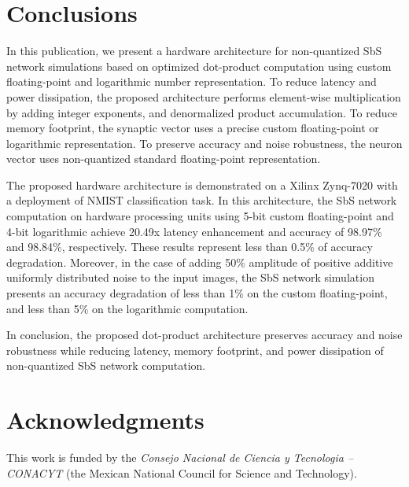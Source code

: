 \section{Conclusions}
In this publication, we present a hardware architecture for non-quantized SbS network simulations based on optimized dot-product computation using custom floating-point and logarithmic number representation. To reduce latency and power dissipation, the proposed architecture performs element-wise multiplication by adding integer exponents, and denormalized product accumulation. To reduce memory footprint, the synaptic vector uses a precise custom floating-point or logarithmic representation. To preserve accuracy and noise robustness, the neuron vector uses non-quantized standard floating-point representation.

The proposed hardware architecture is demonstrated on a Xilinx Zynq-7020 with a deployment of NMIST classification task. In this architecture, the SbS network computation on hardware processing units using 5-bit custom floating-point and 4-bit logarithmic achieve 20.49x latency enhancement and accuracy of 98.97\% and 98.84\%, respectively. These results represent less than 0.5\% of accuracy degradation. Moreover, in the case of adding 50\% amplitude of positive additive uniformly distributed noise to the input images, the SbS network simulation presents an accuracy degradation of less than 1\% on the custom floating-point, and less than 5\% on the logarithmic computation.

In conclusion, the proposed dot-product architecture preserves accuracy and noise robustness while reducing latency, memory footprint, and power dissipation of non-quantized SbS network computation.

\section * {Acknowledgments}\label{sec:Ack}
This work is funded by the \textit{Consejo Nacional de Ciencia y Tecnologia -- CONACYT} (the Mexican National Council for Science and Technology).
